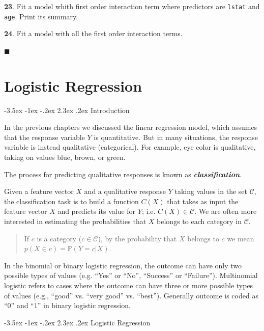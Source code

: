 \documentclass[]{book}
\makeatletter
\renewcommand\section{\@startsection {section}{1}{\z@}%
                                   {-3.5ex \@plus -1ex \@minus -.2ex}%
                                   {2.3ex \@plus.2ex}%
                                   {\normalfont\Large\bfseries\color{ForestGreen}}}
\theoremstyle{definition}
\theoremstyle{definition}
\theoremstyle{definition}
\theoremstyle{remark}
\makeatother
\begin{document}
\textbf{23}. Fit a model whith first order interaction term where
predictors are \texttt{lstat} and \texttt{age}. Print its summary.

\textbf{24}. Fit a model with all the first order interaction terms.

◼

\chapter{Logistic Regression}\label{logistic-regression}

\section{Introduction}\label{introduction-1}

In the previous chapters we discussed the linear regression model, which
assumes that the response variable \(Y\) is quantitative. But in many
situations, the response variable is instead qualitative (categorical).
For example, eye color is qualitative, taking on values blue, brown, or
green.

The process for predicting qualitative responses is known as
\textbf{\emph{classification}}.

Given a feature vector \(X\) and a qualitative response \(Y\) taking
values in the set \(\mathcal{C}\), the classification task is to build a
function \(C(X)\) that takes as input the feature vector \(X\) and
predicts its value for \(Y\); i.e. \(C(X) \in \mathcal{C}\). We are
often more interested in estimating the probabilities that \(X\) belongs
to each category in \(\mathcal{C}\).

\begin{quote}
If \(c\) is a category (\(c \in \mathcal{C}\)), by the probability that
\(X\) belongs to \(c\) we mean \(p(X \in c) = \mathbb{P}(Y=c|X)\).
\end{quote}

In the binomial or binary logistic regression, the outcome can have only
two possible types of values (e.g. ``Yes'' or ``No'', ``Success'' or
``Failure''). Multinomial logistic refers to cases where the outcome can
have three or more possible types of values (e.g., ``good'' vs. ``very
good'' vs. ``best''). Generally outcome is coded as ``0'' and ``1'' in
binary logistic regression.

\section{Logistic Regression}\label{logistic-regression-1}
\end{document}
